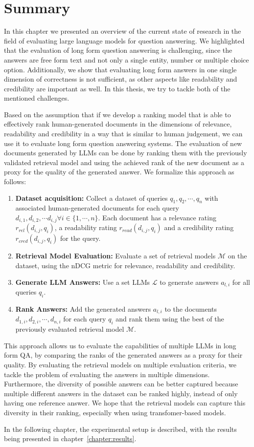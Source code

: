 \section{Summary}
In this chapter we presented an overview of the current state of research in the field of evaluating large language models for question answering.
We highlighted that the evaluation of long form question answering is challenging, since the answers are free form text and not only a single entity, number or multiple choice option.
Additionally, we show that evaluating long form answers in one single dimension of correctness is not sufficient, as other aspects like readability and credibility are important as well.
In this thesis, we try to tackle both of the mentioned challenges.

Based on the assumption that if we develop a ranking model that is able to effectively rank human-generated documents in the dimensions of relevance, readability and credibility in a way that is similar to human judgement, we can use it to evaluate long form question answering systems.
The evaluation of new documents generated by LLMs can be done by ranking them with the previously validated retrieval model and using the achieved rank of the new document as a proxy for the quality of the generated answer.
We formalize this approach as follows:
\begin{enumerate}
    \item \textbf{Dataset acquisition:} Collect a dataset of queries \( q_1, q_2, \cdots, q_n \) with associated human-generated documents for each query \( d_{i,1}, d_{i,2}, \cdots d_{i,j} \forall i \in \{1, \cdots, n\} \). Each document has a relevance rating \( r_{rel}(d_{i,j}, q_i) \), a readability rating \( r_{read}(d_{i,j}, q_i) \) and a credibility rating \( r_{cred}(d_{i,j}, q_i) \) for the query.
    \item \textbf{Retrieval Model Evaluation:} Evaluate a set of retrieval models \( \mathcal{M}\) on the dataset, using the nDCG metric for relevance, readability and credibility.
    \item \textbf{Generate LLM Answers:} Use a set LLMs \( \mathcal{L} \) to generate answers \( a_{l,i} \) for all queries \( q_i \).
    \item \textbf{Rank Answers:} Add the generated answers \( a_{l,i} \) to the documents \(d_{1,i}, d_{2,i}, \cdots, d_{n,i} \) for each query \( q_i \) and rank them using the best of the previously evaluated retrieval model \( \mathcal{M} \).
\end{enumerate}
This approach allows us to evaluate the capabilities of multiple LLMs in long form QA, by comparing the ranks of the generated answers as a proxy for their quality.
By evaluating the retrieval models on multiple evaluation criteria, we tackle the problem of evaluating the answers in multiple dimensions.
Furthermore, the diversity of possible answers can be better captured because multiple different answers in the dataset can be ranked highly, instead of only having one reference answer.
We hope that the retrieval models can capture this diversity in their ranking, especially when using transfomer-based models.

In the following chapter, the experimental setup is described, with the results being presented in chapter~\ref{chapter:results}.